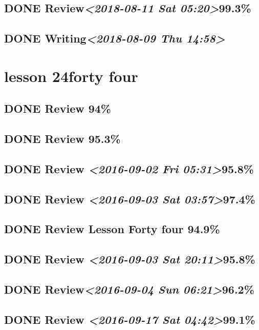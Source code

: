\documentclass[11pt]{ctexart}
\begin{document}
\subsection{{\bfseries\sffamily DONE} Review\textit{<2018-08-11 Sat 05:20>}99.3\%}
\label{sec:org4ee982c}
\subsection{{\bfseries\sffamily DONE} Writing\textit{<2018-08-09 Thu 14:58>}}
\label{sec:orgc5cc643}
\section{lesson 24forty four}
\label{sec:org41b42cd}
\subsection{{\bfseries\sffamily DONE} Review 94\%}
\label{sec:orgc462f20}
\subsection{{\bfseries\sffamily DONE} Review 95.3\%}
\label{sec:org9a0fe81}
\subsection{{\bfseries\sffamily DONE} Review \textit{<2016-09-02 Fri 05:31>}95.8\%}
\label{sec:org5a73f5d}
\subsection{{\bfseries\sffamily DONE} Review \textit{<2016-09-03 Sat 03:57>}97.4\%}
\label{sec:org2f1925a}
\subsection{{\bfseries\sffamily DONE} Review Lesson Forty four 94.9\%}
\label{sec:orge04629d}

\subsection{{\bfseries\sffamily DONE} Review \textit{<2016-09-03 Sat 20:11>}95.8\%}
\label{sec:org1100843}
\subsection{{\bfseries\sffamily DONE} Review\textit{<2016-09-04 Sun 06:21>}96.2\%}
\label{sec:org1892e05}
\subsection{{\bfseries\sffamily DONE} Review \textit{<2016-09-17 Sat 04:42>}99.1\%}
\label{sec:orgea61882}
\end{document}
